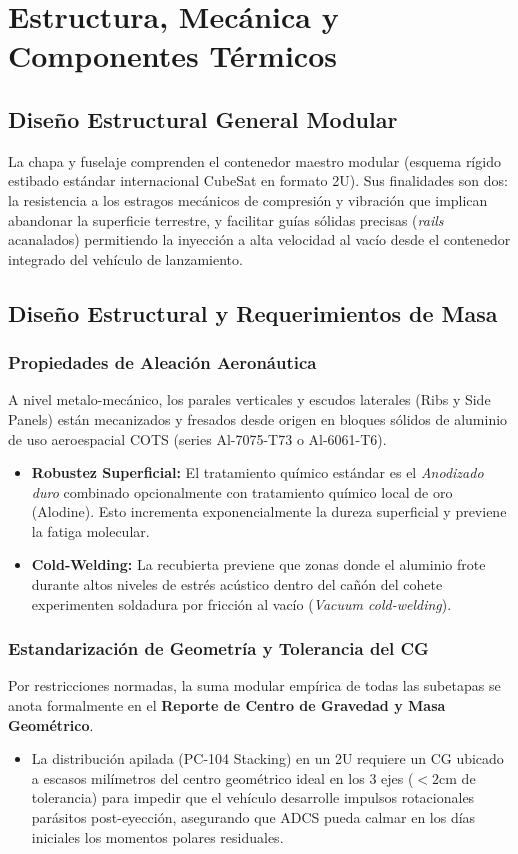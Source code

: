 \chapter{Estructura, Mecánica y Componentes Térmicos}

\section{Diseño Estructural General Modular}
La chapa y fuselaje comprenden el contenedor maestro modular (esquema rígido estibado estándar internacional CubeSat en formato 2U). Sus finalidades son dos: la resistencia a los estragos mecánicos de compresión y vibración que implican abandonar la superficie terrestre, y facilitar guías sólidas precisas (\textit{rails} acanalados) permitiendo la inyección a alta velocidad al vacío desde el contenedor integrado del vehículo de lanzamiento.

\section{Diseño Estructural y Requerimientos de Masa}
\subsection{Propiedades de Aleación Aeronáutica}
A nivel metalo-mecánico, los parales verticales y escudos laterales (Ribs y Side Panels) están mecanizados y fresados desde origen en bloques sólidos de aluminio de uso aeroespacial COTS (series Al-7075-T73 o Al-6061-T6). 
\begin{itemize}
    \item \textbf{Robustez Superficial:} El tratamiento químico estándar es el \textit{Anodizado duro} combinado opcionalmente con tratamiento químico local de oro (Alodine). Esto incrementa exponencialmente la dureza superficial y previene la fatiga molecular.
    \item \textbf{Cold-Welding:} La recubierta previene que zonas donde el aluminio frote durante altos niveles de estrés acústico dentro del cañón del cohete experimenten soldadura por fricción al vacío (\textit{Vacuum cold-welding}).
\end{itemize}

\subsection{Estandarización de Geometría y Tolerancia del CG}
Por restricciones normadas, la suma modular empírica de todas las subetapas se anota formalmente en el \textbf{Reporte de Centro de Gravedad y Masa Geométrico}. 
\begin{itemize}
    \item La distribución apilada (PC-104 Stacking) en un 2U requiere un CG ubicado a escasos milímetros del centro geométrico ideal en los 3 ejes ($<2\text{cm}$ de tolerancia) para impedir que el vehículo desarrolle impulsos rotacionales parásitos post-eyección, asegurando que ADCS pueda calmar en los días iniciales los momentos polares residuales.
\end{itemize}

